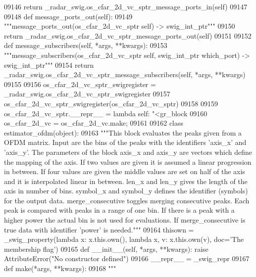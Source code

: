 \begin{DoxyCode}
{{{{{{{{{{{{{{{{{{{{{{{{{{{{{09146         \textcolor{keywordflow}{return} \_radar\_swig.os\_cfar\_2d\_vc\_sptr\_message\_ports\_in(self)
09147 
09148     \textcolor{keyword}{def }message_ports_out(self):
09149         \textcolor{stringliteral}{"""message\_ports\_out(os\_cfar\_2d\_vc\_sptr self) -> swig\_int\_ptr"""}
09150         \textcolor{keywordflow}{return} \_radar\_swig.os\_cfar\_2d\_vc\_sptr\_message\_ports\_out(self)
09151 
09152     \textcolor{keyword}{def }message_subscribers(self, *args, **kwargs):
09153         \textcolor{stringliteral}{"""message\_subscribers(os\_cfar\_2d\_vc\_sptr self, swig\_int\_ptr which\_port) -> swig\_int\_ptr"""}
09154         \textcolor{keywordflow}{return} \_radar\_swig.os\_cfar\_2d\_vc\_sptr\_message\_subscribers(self, *args, **kwargs)
09155 
09156 os\_cfar\_2d\_vc\_sptr\_swigregister = \_radar\_swig.os\_cfar\_2d\_vc\_sptr\_swigregister
09157 os_cfar_2d_vc_sptr_swigregister(os\_cfar\_2d\_vc\_sptr)
09158 
09159 os\_cfar\_2d\_vc\_sptr.\_\_repr\_\_ = \textcolor{keyword}{lambda} self: \textcolor{stringliteral}{"<gr\_block %
09160 os\_cfar\_2d\_vc = os\_cfar\_2d\_vc.make;
09161 
09162 \textcolor{keyword}{class }estimator_ofdm(object):
09163     \textcolor{stringliteral}{"""This block evaluates the peaks given from a OFDM matrix. Input are the bins of the peaks with the
       identifiers 'axis\_x' and 'axis\_y'. The parameters of the block axis\_x and axis\_y are vectors which define the
       mapping of the axis. If two values are given it is assumed a linear progression in between. If four values
       are given the middle values are set on half of the axis and it is interpolated linear in between. len\_x and
       len\_y gives the length of the axis in number of bins. symbol\_x and symbol\_y defines the identifier (symbols)
       for the output data. merge\_consecutive toggles merging consecutive peaks. Each peak is compared with peaks
       in a range of one bin. If there is a peak with a higher power the actual bin is not used for evaluations. If
       merge\_consecutive is true data with identifier 'power' is needed."""}
09164     thisown = _swig_property(\textcolor{keyword}{lambda} x: x.this.own(), \textcolor{keyword}{lambda} x, v: x.this.own(v), doc=\textcolor{stringliteral}{'The membership flag'})
09165     \textcolor{keyword}{def }__init__(self, *args, **kwargs): \textcolor{keywordflow}{raise} AttributeError(\textcolor{stringliteral}{"No constructor defined"})
09166     \_\_repr\_\_ = \_swig\_repr
09167     \textcolor{keyword}{def }make(*args, **kwargs):
09168         \textcolor{stringliteral}{"""}
}}}}}}}}}}}}}}}}}}}}}}}}}}}}}}
\end{DoxyCode}
